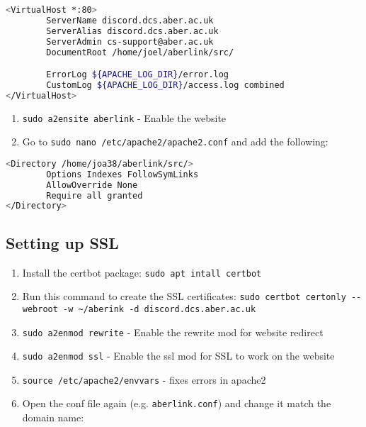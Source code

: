 \begin{lstlisting}[language=bash]
<VirtualHost *:80>
        ServerName discord.dcs.aber.ac.uk
        ServerAlias discord.dcs.aber.ac.uk
        ServerAdmin cs-support@aber.ac.uk
        DocumentRoot /home/joel/aberlink/src/

        ErrorLog ${APACHE_LOG_DIR}/error.log
        CustomLog ${APACHE_LOG_DIR}/access.log combined
</VirtualHost>
\end{lstlisting}

\begin{enumerate}
\def\labelenumi{\arabic{enumi}.}
\setcounter{enumi}{6}
\item
  \texttt{sudo a2ensite aberlink} - Enable the website
\item
  Go to \texttt{sudo nano /etc/apache2/apache2.conf} and add the
  following:
\end{enumerate}

\begin{lstlisting}[language=bash]
<Directory /home/joa38/aberlink/src/>
        Options Indexes FollowSymLinks
        AllowOverride None
        Require all granted
</Directory>
\end{lstlisting}

\subsection{Setting up SSL}\label{setting-up-ssl}

\begin{enumerate}
\def\labelenumi{\arabic{enumi}.}
\item
  Install the certbot package: \texttt{sudo apt intall certbot}
\item
  Run this command to create the SSL certificates:
  \texttt{sudo certbot certonly -{}-webroot -w \textasciitilde{}/aberink -d discord.dcs.aber.ac.uk}
\item
  \texttt{sudo a2enmod rewrite} - Enable the rewrite mod for website
  redirect
\item
  \texttt{sudo a2enmod ssl} - Enable the ssl mod for SSL to work on the
  website
\item
  \texttt{source /etc/apache2/envvars} - fixes errors in apache2
\item
  Open the conf file again (e.g. \texttt{aberlink.conf}) and change it
  match the domain name:
\end{enumerate}

